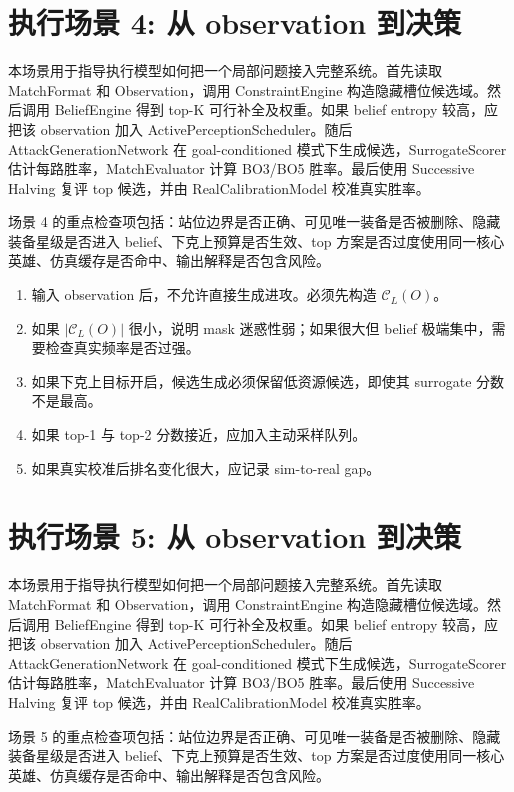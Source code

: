 \documentclass[UTF8,12pt,openany]{ctexbook}
\newcommand{\Ccal}{\mathcal{C}}
\begin{document}
\section{执行场景 4: 从 observation 到决策}
本场景用于指导执行模型如何把一个局部问题接入完整系统。首先读取 MatchFormat 和 Observation，调用 ConstraintEngine 构造隐藏槽位候选域。然后调用 BeliefEngine 得到 top-K 可行补全及权重。如果 belief entropy 较高，应把该 observation 加入 ActivePerceptionScheduler。随后 AttackGenerationNetwork 在 goal-conditioned 模式下生成候选，SurrogateScorer 估计每路胜率，MatchEvaluator 计算 BO3/BO5 胜率。最后使用 Successive Halving 复评 top 候选，并由 RealCalibrationModel 校准真实胜率。

场景 4 的重点检查项包括：站位边界是否正确、可见唯一装备是否被删除、隐藏装备星级是否进入 belief、下克上预算是否生效、top 方案是否过度使用同一核心英雄、仿真缓存是否命中、输出解释是否包含风险。

\begin{enumerate}[leftmargin=2em]
\item 输入 observation 后，不允许直接生成进攻。必须先构造 $\Ccal_L(O)$。
\item 如果 $|\Ccal_L(O)|$ 很小，说明 mask 迷惑性弱；如果很大但 belief 极端集中，需要检查真实频率是否过强。
\item 如果下克上目标开启，候选生成必须保留低资源候选，即使其 surrogate 分数不是最高。
\item 如果 top-1 与 top-2 分数接近，应加入主动采样队列。
\item 如果真实校准后排名变化很大，应记录 sim-to-real gap。
\end{enumerate}


\section{执行场景 5: 从 observation 到决策}
本场景用于指导执行模型如何把一个局部问题接入完整系统。首先读取 MatchFormat 和 Observation，调用 ConstraintEngine 构造隐藏槽位候选域。然后调用 BeliefEngine 得到 top-K 可行补全及权重。如果 belief entropy 较高，应把该 observation 加入 ActivePerceptionScheduler。随后 AttackGenerationNetwork 在 goal-conditioned 模式下生成候选，SurrogateScorer 估计每路胜率，MatchEvaluator 计算 BO3/BO5 胜率。最后使用 Successive Halving 复评 top 候选，并由 RealCalibrationModel 校准真实胜率。

场景 5 的重点检查项包括：站位边界是否正确、可见唯一装备是否被删除、隐藏装备星级是否进入 belief、下克上预算是否生效、top 方案是否过度使用同一核心英雄、仿真缓存是否命中、输出解释是否包含风险。
\end{document}
